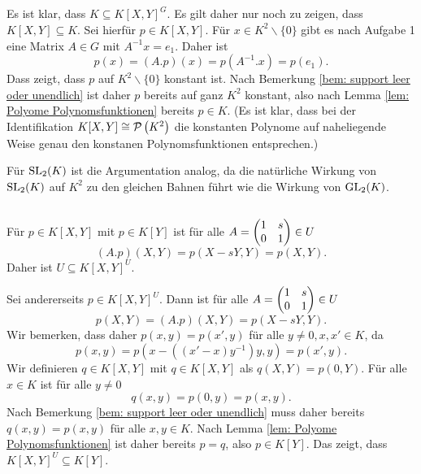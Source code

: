 \documentclass[a4paper,10pt]{article}
\begin{document}
\subsection{}
Es ist klar, dass $K \subseteq K[X,Y]^G$. Es gilt daher nur noch zu zeigen, dass $K[X,Y] \subseteq K$. Sei hierfür $p \in K[X,Y]$. Für $x \in K^2 \smallsetminus \{0\}$ gibt es nach Aufgabe 1 eine Matrix $A \in G$ mit $A^{-1}x = e_1$. Daher ist
\[
 p(x) = (A.p)(x) = p\left(A^{-1}.x\right) = p(e_1).
\]
Dass zeigt, dass $p$ auf $K^2 \smallsetminus \{0\}$ konstant ist. Nach Bemerkung \ref{bem: support leer oder unendlich} ist daher $p$ bereits auf ganz $K^2$ konstant, also nach Lemma \ref{lem: Polyome Polynomsfunktionen} bereits $p \in K$. (Es ist klar, dass bei der Identifikation $K[X,Y] \cong \mathcal{P}\left(K^2\right)$ die konstanten Polynome auf naheliegende Weise genau den konstanen Polynomsfunktionen entsprechen.)

Für $\operatorname{SL}_2(K)$ ist die Argumentation analog, da die natürliche Wirkung von $\operatorname{SL}_2(K)$ auf $K^2$ zu den gleichen Bahnen führt wie die Wirkung von $\operatorname{GL}_2(K)$.


\subsection{}
Für $p \in K[X,Y]$ mit $p \in K[Y]$ ist für alle $A = \begin{pmatrix}1 & s \\ 0 & 1\end{pmatrix} \in U$
\[
 (A.p)(X,Y) = p(X-sY,Y) = p(X,Y).
\]
Daher ist $U \subseteq K[X,Y]^U$.

Sei andererseits $p \in K[X,Y]^U$. Dann ist für alle $A = \begin{pmatrix}1 & s \\ 0 & 1\end{pmatrix} \in U$
\[
 p(X,Y) = (A.p)(X,Y) = p(X-sY,Y).
\]
Wir bemerken, dass daher $p(x,y) = p(x',y)$ für alle $y \neq 0, x, x' \in K$, da
\[
 p(x,y) = p\left(x-\left((x'-x)y^{-1}\right)y,y\right) = p(x',y).
\]
Wir definieren $q \in K[X,Y]$ mit $q \in K[X,Y]$ als $q(X,Y) = p(0,Y)$. Für alle $x \in K$ ist für alle $y \neq 0$
\[
 q(x,y) = p(0,y) = p(x,y).
\]
Nach Bemerkung \ref{bem: support leer oder unendlich} muss daher bereits $q(x,y) = p(x,y)$ für alle $x, y \in K$. Nach Lemma \ref{lem: Polyome Polynomsfunktionen} ist daher bereits $p = q$, also $p \in K[Y]$. Das zeigt, dass $K[X,Y]^U \subseteq K[Y]$.





\section{}
\end{document}
